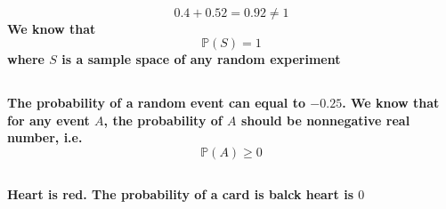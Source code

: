 \documentclass{article}
\begin{document}
            \paragraph{
                $$0.4+0.52=0.92\neq 1$$
                We know that $$\mathbb{P}(S)=1$$ where $S$ is a sample space of any random experiment
            }
        \subsection{}
            \paragraph{
                The probability of a random event can equal to $-0.25$. We know that for any event $A$, the probability of $A$ should be nonnegative real number, i.e. $$\mathbb{P}(A)\geq 0$$
            }
        \subsection{}
            \paragraph{
                Heart is red. The probability of a card is balck heart is $0$
            }
    \section{}
\end{document}
